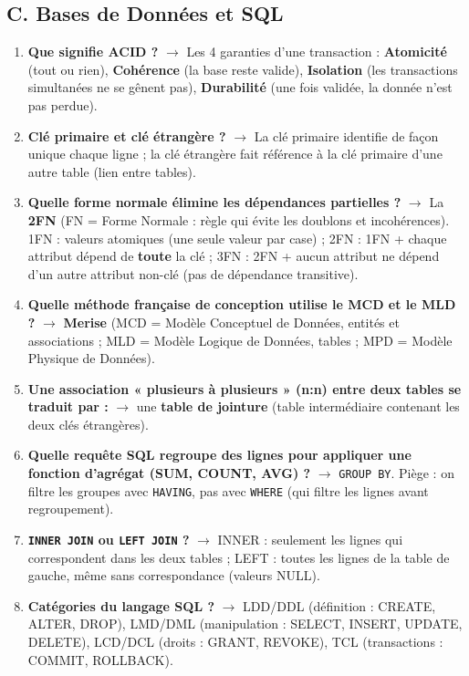 \subsection*{C. Bases de Données et SQL}
\begin{enumerate}[leftmargin=*]
    \item \textbf{Que signifie ACID ?} $\rightarrow$ Les 4 garanties d'une transaction : \textbf{Atomicité} (tout ou rien), \textbf{Cohérence} (la base reste valide), \textbf{Isolation} (les transactions simultanées ne se gênent pas), \textbf{Durabilité} (une fois validée, la donnée n'est pas perdue).
    \item \textbf{Clé primaire et clé étrangère ?} $\rightarrow$ La clé primaire identifie de façon unique chaque ligne ; la clé étrangère fait référence à la clé primaire d'une autre table (lien entre tables).
    \item \textbf{Quelle forme normale élimine les dépendances partielles ?} $\rightarrow$ La \textbf{2FN} (FN = Forme Normale : règle qui évite les doublons et incohérences). 1FN : valeurs atomiques (une seule valeur par case) ; 2FN : 1FN + chaque attribut dépend de \textbf{toute} la clé ; 3FN : 2FN + aucun attribut ne dépend d'un autre attribut non-clé (pas de dépendance transitive).
    \item \textbf{Quelle méthode française de conception utilise le MCD et le MLD ?} $\rightarrow$ \textbf{Merise} (MCD = Modèle Conceptuel de Données, entités et associations ; MLD = Modèle Logique de Données, tables ; MPD = Modèle Physique de Données).
    \item \textbf{Une association « plusieurs à plusieurs » (n:n) entre deux tables se traduit par :} $\rightarrow$ une \textbf{table de jointure} (table intermédiaire contenant les deux clés étrangères).
    \item \textbf{Quelle requête SQL regroupe des lignes pour appliquer une fonction d'agrégat (SUM, COUNT, AVG) ?} $\rightarrow$ \texttt{GROUP BY}. Piège : on filtre les groupes avec \texttt{HAVING}, pas avec \texttt{WHERE} (qui filtre les lignes avant regroupement).
    \item \textbf{\texttt{INNER JOIN} ou \texttt{LEFT JOIN} ?} $\rightarrow$ INNER : seulement les lignes qui correspondent dans les deux tables ; LEFT : toutes les lignes de la table de gauche, même sans correspondance (valeurs NULL).
    \item \textbf{Catégories du langage SQL ?} $\rightarrow$ LDD/DDL (définition : CREATE, ALTER, DROP), LMD/DML (manipulation : SELECT, INSERT, UPDATE, DELETE), LCD/DCL (droits : GRANT, REVOKE), TCL (transactions : COMMIT, ROLLBACK).

\end{enumerate}
